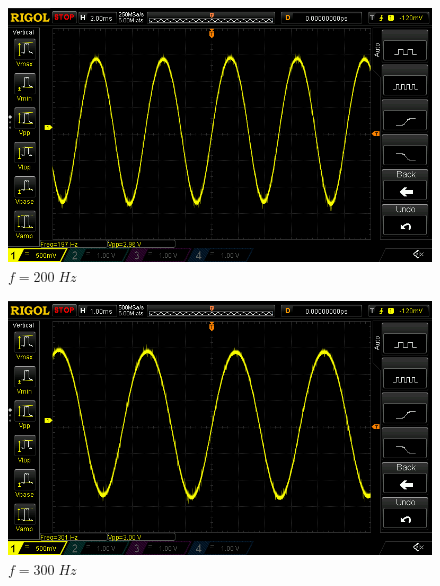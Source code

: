\documentclass[uplatex,a4paper,11pt,oneside,openany]{jsbook}
\begin{document}
\begin{spacing}{0.67}
  \begin{multicols}{2}
    \begin{figure}[H]
       \centering
        \includegraphics[keepaspectratio, scale=0.28, angle=0]
                    {rigol/figs/FrqCharM1Y1_2kR/200hz.png}
                    \caption{$f=200\;Hz$}
                    \label{fig:frq200}
    \end{figure}
  
    \begin{figure}[H]
       \centering
        \includegraphics[keepaspectratio, scale=0.28, angle=0]
                  {rigol/figs/FrqCharM1Y1_2kR/300hz.png}
                  \caption{$f=300\;Hz$}
                  \label{fig:frq300}
    \end{figure}
  \end{multicols}


\end{spacing}
\end{document}
